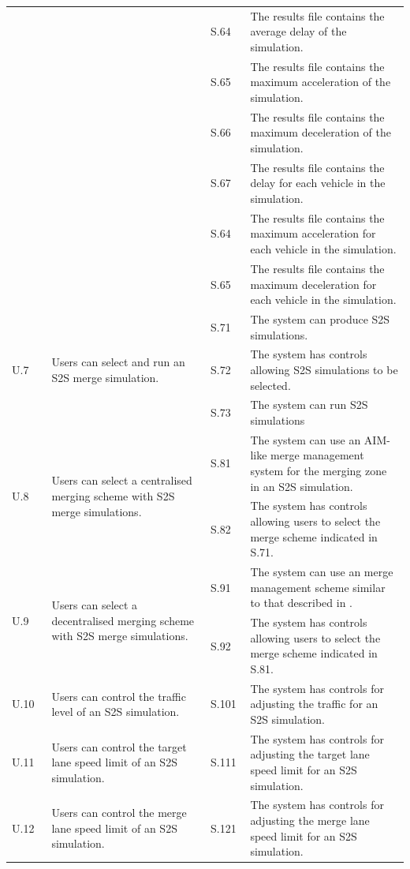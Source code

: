 \begin{longtable}{|p{0.1\linewidth}|p{0.4\linewidth}|p{0.1\linewidth}|p{0.4\linewidth}|}
 &  & S.64 & The results file contains the average delay of the simulation. \\
 &  & S.65 & The results file contains the maximum acceleration of the simulation. \\
 &  & S.66 & The results file contains the maximum deceleration of the simulation. \\
 &  & S.67 & The results file contains the delay for each vehicle in the simulation. \\
 &  & S.64 & The results file contains the maximum acceleration for each vehicle in the simulation. \\
 &  & S.65 & The results file contains the maximum deceleration for each vehicle in the simulation. \\ 
\hline
\multirow{3}{*}{U.7} & \multirow{3}{*}{\parbox{\linewidth}{Users can select and run an S2S merge simulation.}}
 & S.71 & The system can produce S2S simulations. \\
 &  & S.72 & The system has controls allowing S2S simulations to be selected. \\
 &  & S.73 & The system can run S2S simulations \\ 
\hline
\multirow{2}{*}{U.8} & \multirow{2}{*}{\parbox{\linewidth}{Users can select a centralised merging scheme with S2S merge simulations.}}
 & S.81 & The system can use an AIM-like merge management system for the merging zone in an S2S simulation. \\
 &  & S.82 & The system has controls allowing users to select the merge scheme indicated in S.71. \\ 
\hline
\multirow{2}{*}{U.9} & \multirow{2}{*}{\parbox{\linewidth}{Users can select a decentralised merging scheme with S2S merge simulations.}}
 & S.91 & The system can use an merge management scheme similar to that described in \citep{VanMiddlesworth2008}. \\
 &  & S.92 & The system has controls allowing users to select the merge scheme indicated in S.81. \\ 
\hline
U.10 & Users can control the traffic level of an S2S simulation. & S.101 & The system has controls for adjusting the traffic for an S2S simulation. \\ 
\hline
U.11 & Users can control the target lane speed limit of an S2S simulation. & S.111 & The system has controls for adjusting the target lane speed limit for an S2S simulation. \\ 
\hline
U.12 & Users can control the merge lane speed limit of an S2S simulation. & S.121 & The system has controls for adjusting the merge lane speed limit for an S2S simulation. \\ 

\end{longtable}
